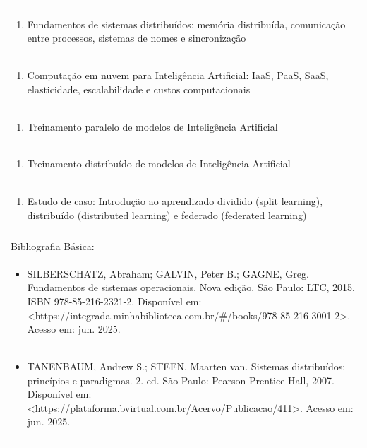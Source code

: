\documentclass[11pt]{article}
\begin{document}
\begin{center}
\begin{longtable}{|p{4cm}|p{4cm}|p{4cm}|p{4cm}|}
\multicolumn{4}{|p{\dimexpr 16cm + 6\tabcolsep\relax}|}{\begin{enumerate}[start=9]\item Fundamentos de sistemas distribuídos: memória distribuída, comunicação entre processos, sistemas de nomes e sincronização\end{enumerate}}\\
\multicolumn{4}{|p{\dimexpr 16cm + 6\tabcolsep\relax}|}{\begin{enumerate}[start=10]\item Computação em nuvem para Inteligência Artificial: IaaS, PaaS, SaaS, elasticidade, escalabilidade e custos computacionais\end{enumerate}}\\
\multicolumn{4}{|p{\dimexpr 16cm + 6\tabcolsep\relax}|}{\begin{enumerate}[start=11]\item Treinamento paralelo de modelos de Inteligência Artificial\end{enumerate}}\\
\multicolumn{4}{|p{\dimexpr 16cm + 6\tabcolsep\relax}|}{\begin{enumerate}[start=12]\item Treinamento distribuído de modelos de Inteligência Artificial\end{enumerate}}\\
\multicolumn{4}{|p{\dimexpr 16cm + 6\tabcolsep\relax}|}{\begin{enumerate}[start=13]\item Estudo de caso: Introdução ao aprendizado dividido (split learning), distribuído (distributed learning) e federado (federated learning)\end{enumerate}}\\
\multicolumn{4}{|p{\dimexpr 16cm + 6\tabcolsep\relax}|}{}\\
\hline
\multicolumn{4}{|p{16cm}|}{Bibliografia Básica:}\\*
\multicolumn{4}{|p{\dimexpr 16cm + 6\tabcolsep\relax}|}{\begin{itemize}\item SILBERSCHATZ, Abraham; GALVIN, Peter B.; GAGNE, Greg. Fundamentos de sistemas operacionais. Nova edição. São Paulo: LTC, 2015. ISBN 978-85-216-2321-2. Disponível em: <https://integrada.minhabiblioteca.com.br/\#/books/978-85-216-3001-2>. Acesso em: jun. 2025.\end{itemize}}\\
\multicolumn{4}{|p{\dimexpr 16cm + 6\tabcolsep\relax}|}{\begin{itemize}\item TANENBAUM, Andrew S.; STEEN, Maarten van. Sistemas distribuídos: princípios e paradigmas. 2. ed. São Paulo: Pearson Prentice Hall, 2007. Disponível em: <https://plataforma.bvirtual.com.br/Acervo/Publicacao/411>. Acesso em: jun. 2025.\end{itemize}}\\

\end{longtable}
\end{center}
\end{document}
